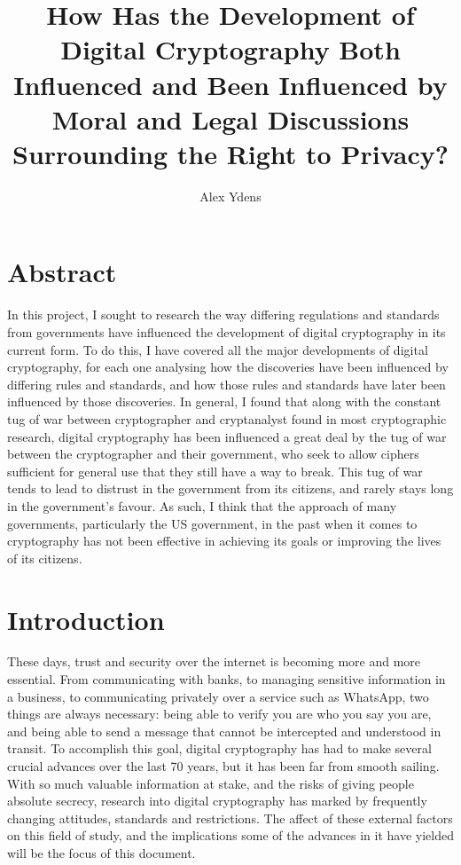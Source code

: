 \documentclass[a4paper,12pt]{report}
\title{How Has the Development of Digital Cryptography Both Influenced and Been
Influenced by Moral and Legal Discussions Surrounding the Right to Privacy?}
\author{Alex Ydens}
\begin{document}
  \frenchspacing
  \maketitle
  \newpage
  \tableofcontents

  \newpage
  \section{Abstract}
In this project, I sought to research the way differing regulations and
standards from governments have influenced the development of digital
cryptography in its current form. To do this, I have covered all the major
developments of digital cryptography, for each one analysing how the discoveries
have been influenced by differing rules and standards, and how those rules and
standards have later been influenced by those discoveries. In general, I found
that along with the constant tug of war between cryptographer and cryptanalyst
found in most cryptographic research, digital cryptography has been influenced a
great deal by the tug of war between the cryptographer and their government, who
seek to allow ciphers sufficient for general use that they still have a way to
break. This tug of war tends to lead to distrust in the government from its
citizens, and rarely stays long in the government's favour. As such, I think
that the approach of many governments, particularly the US government, in the
past when it comes to cryptography has not been effective in achieving its goals
or improving the lives of its citizens.

  \newpage
  \section{Introduction}
These days, trust and security over the internet is becoming more and more
essential. From communicating with banks, to managing sensitive information in a
business, to communicating privately over a service such as WhatsApp, two things
are always necessary: being able to verify you are who you say you are, and
being able to send a message that cannot be intercepted and understood in
transit. To accomplish this goal, digital cryptography has had to make several
crucial advances over the last 70 years, but it has been far from smooth
sailing. With so much valuable information at stake, and the risks of giving
people absolute secrecy, research into digital cryptography has marked by
frequently changing attitudes, standards and restrictions. The affect of these
external factors on this field of study, and the implications some of the
advances in it have yielded will be the focus of this document.
\end{document}
